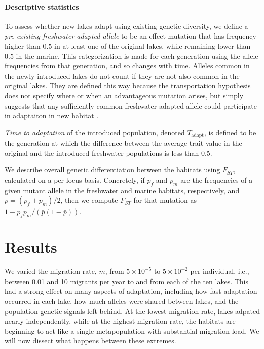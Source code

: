 \documentclass{article}
\begin{document}
\paragraph{Descriptive statistics}
To assess whether new lakes adapt using existing genetic diversity,
we define a \emph{pre-existing freshwater adapted allele}
to be an effect mutation that has frequency higher than $0.5$ in at least one of the original lakes,
while remaining lower than $0.5$ in the marine. 
This categorization is made for each generation using the allele frequencies from that generation,
and so changes with time.
Alleles common in the newly introduced lakes do not count
if they are not also common in the original lakes.
They are defined this way because the transportation hypothesis 
does not specify where or when an advantageous mutation arises,
but simply suggests that any sufficiently common freshwater adapted allele 
could participate in adaptaiton in new habitat \citep{schluter2009genetics}.

\emph{Time to adaptation} of the introduced population, denoted $T_\text{adapt}$, 
is defined to be the generation at which 
the difference between the average trait value in the original and the introduced freshwater populations 
is less than 0.5. 

We describe overall genetic differentiation between the habitats using $F_{ST}$,
calculated on a per-locus basis.
Concretely, if $p_f$ and $p_m$ are the frequencies of a given mutant allele
in the freshwater and marine habitats, respectively,
and $\bar p = (p_f + p_m)/2$,
then we compute $F_{ST}$ for that mutation as $1 - p_f p_m / (\bar p (1-\bar p))$.


\section{Results}

We varied the migration rate, $m$,
from $5 \times 10^{-5}$ to $5 \times 10^{-2}$ per individual,
i.e., between 0.01 and 10 migrants per year to and from each of the ten lakes.
This had a strong effect on many aspects of adaptation,
including how fast adaptation occurred in each lake,
how much alleles were shared between lakes,
and the population genetic signals left behind.
At the lowest migration rate, lakes adpated nearly independently,
while at the highest migration rate, the habitats are beginning to act like a single metapopulation
with substantial migration load.
We will now dissect what happens between these extremes.
\end{document}
